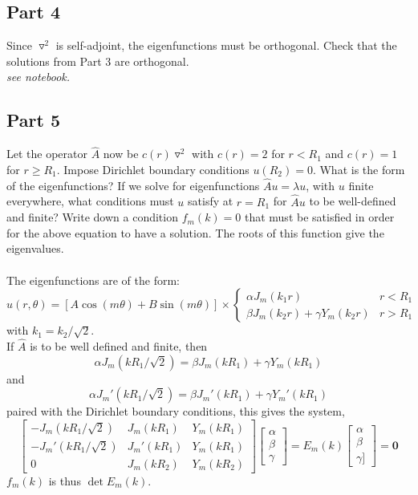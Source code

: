 \documentclass{amsart}
\begin{document}
	\subsection{Part 4}
	Since $\triangledown^2$ is self-adjoint, the eigenfunctions must be orthogonal. Check that the solutions from Part 3 are orthogonal.
	\\
	\textit{see notebook.}
	\\
	\subsection{Part 5}
	Let the operator $\hat{A}$ now be $c(r)\triangledown^2$ with $c(r)=2$ for $r<R_1$ and $c(r)=1$ for $r\geq R_1$. Impose Dirichlet boundary conditions $u(R_2)=0$. What is the form of the eigenfunctions? If we solve for eigenfunctions $\hat{A}u = \lambda u$, with $u$ finite everywhere, what conditions must $u$ satisfy at $r=R_1$ for $\hat{A}u$ to be well-defined and finite? Write down a condition $f_m(k)=0$ that must be satisfied in order for the above equation to have a solution. The roots of this function give the eigenvalues.
	\\\\
	The eigenfunctions are of the form:
	\[
	u(r,\theta) = [A\cos(m\theta) + B\sin(m\theta)] \times \left\lbrace
	\begin{matrix}
		\alpha J_m(k_1r) & r<R_1\\
		\beta J_m(k_2r) + \gamma Y_m(k_2r) & r>R_1
	\end{matrix}\right.
	\]
	with $k_1 = k_2/\sqrt{2}$.\\
	
	If $\hat{A}$ is to be well defined and finite, then
	\[
	\alpha J_m(kR_1/\sqrt{2}) = \beta J_m(kR_1)+\gamma Y_m(kR_1)
	\]
	and
	\[
	\alpha J_m'(kR_1/\sqrt{2}) = \beta J_m'(kR_1) + \gamma Y_m'(kR_1)
	\]
	paired with the Dirichlet boundary conditions, this gives the system,
	\[
	\left[
	\begin{matrix}
		-J_m(kR_1/\sqrt{2}) & J_m(kR_1) & Y_m(kR_1)\\
		-J_m'(kR_1/\sqrt{2}) & J_m'(kR_1) & Y_m(kR_1)\\
		0 & J_m(kR_2) & Y_m(kR_2)
	\end{matrix}\right]
	\left[
	\begin{matrix}
		\alpha \\ \beta \\ \gamma
	\end{matrix}
	\right]= E_m(k)
	\left[
	\begin{matrix}
		\alpha \\ \beta \\ \gamma]
	\end{matrix}
	\right] = \mathbf{0}
	\]
	$f_m(k)$ is thus $\det E_m(k)$.
	
\end{document}
